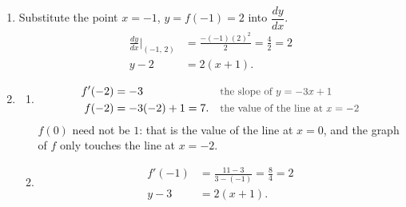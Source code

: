 \documentclass[11pt,a4paper]{article}
\newcommand{\why}[1]{\text{\small\color{darkgray}#1}}
\begin{document}
{\begin{enumerate}[label=(\alph*)]
\begin{enumerate}[label=(\roman*)]
  Requirement 1: $h(0)=0$ and $h'(0)=\dfrac{4\cdot0^3}{16}=0$.
 \end{enumerate}
 \item Substitute the point $x=-1$, $y=f(-1)=2$ into $\dfrac{dy}{dx}$.
 \begin{align*}
 \frac{dy}{dx}\Big|_{(-1,\,2)}&=\frac{-(-1)(2)^2}{2}=\frac{4}{2}=2\\
 y-2&=2(x+1).
 \end{align*}
 \item
 \begin{enumerate}[label=(\roman*)]
  \item
  \begin{align*}
  f'(-2)&=-3 &&\why{the slope of $y=-3x+1$}\\
  f(-2)&=-3(-2)+1=7. &&\why{the value of the line at $x=-2$}
  \end{align*}
  $f(0)$ need not be $1$: that is the value of the line at $x=0$, and the graph of $f$ only touches the line at $x=-2$.
  \item
  \begin{align*}
  f'(-1)&=\frac{11-3}{3-(-1)}=\frac{8}{4}=2\\
  y-3&=2(x+1).
  \end{align*}
 \end{enumerate}
\end{enumerate}
}
\end{document}
